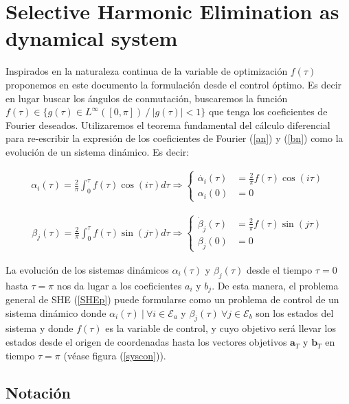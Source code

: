 
\section{Selective Harmonic Elimination as dynamical system}

%


Inspirados en la naturaleza continua de la variable de optimización $f(\tau)$ proponemos en este documento la formulación desde el control óptimo. Es decir en lugar buscar los ángulos de conmutación, buscaremos la función $f(\tau) \in \{ g(\tau)  \in L^\infty([0,\pi])\ /\ |g(\tau)| < 1\} $ que tenga los coeficientes de Fourier deseados. 
%
Utilizaremos el  teorema fundamental del cálculo diferencial para re-escribir la expresión de los coeficientes de Fourier (\ref{an}) y (\ref{bn}) como la evolución de un sistema dinámico. Es decir:

\begin{gather}
    \alpha_i(\tau) = \frac{2}{\pi}\int_0^\tau f(\tau) \cos(i\tau)d\tau 
    \Rightarrow
    \begin{cases} \label{ode}
        \dot{\alpha_i}(\tau) & = \frac{2}{\pi}f(\tau)\cos(i\tau) \\  
        \alpha_i(0) & = 0       
    \end{cases}
\end{gather}

\begin{gather}
    \beta_j(\tau) = \frac{2}{\pi}\int_0^\tau f(\tau) \sin(j\tau)d\tau 
    \Rightarrow
    \begin{cases} \label{ode}
        \dot{\beta}_j(\tau) & = \frac{2}{\pi}f(\tau)\sin(j\tau) \\  
        \beta_j(0) & = 0       
    \end{cases}
\end{gather}

La evolución de los sistemas dinámicos $\alpha_i(\tau)$ y $\beta_j(\tau)$ desde el tiempo $\tau=0$ hasta $\tau=\pi$ nos da lugar a los coeficientes $a_i$ y $b_j$. 
De esta manera, el problema general de SHE (\ref{SHEp}) puede formularse como un problema de control de un sistema dinámico donde $\alpha_i(\tau) \ | \ \forall i \in \mathcal{E}_a  $ y $ \beta_j(\tau) \ \forall j \in \mathcal{E}_b$ son los estados del sistema y donde $f(\tau)$ es la variable de control, y cuyo objetivo será llevar los estados desde el origen de coordenadas hasta los vectores objetivos $\bm{a}_T$ y $\bm{b}_T$ en tiempo $\tau = \pi$ (véase figura (\ref{syscon})).

\subsection{Notación}

